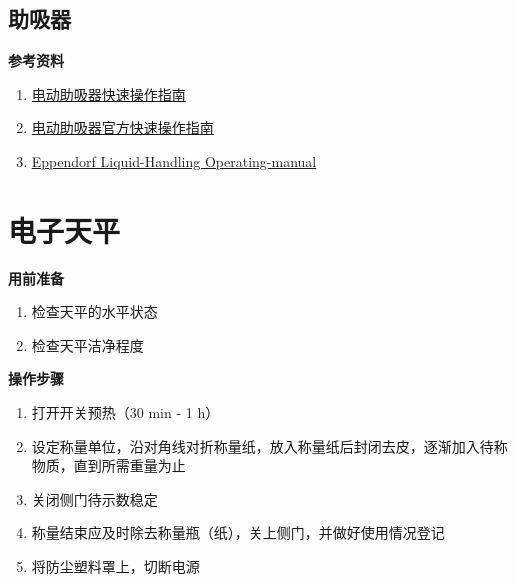 \documentclass[
]{book}
\providecommand{\tightlist}{%
  \setlength{\itemsep}{0pt}\setlength{\parskip}{0pt}}
\begin{document}
\hypertarget{ux52a9ux5438ux5668}{%
\subsection{助吸器}\label{ux52a9ux5438ux5668}}

\textbf{参考资料}

\begin{enumerate}
\def\labelenumi{\arabic{enumi}.}
\tightlist
\item
  \href{http://www.sccos.cn/9.pdf}{电动助吸器快速操作指南}
\item
  \href{https://www.eppendorf.com/product-media/doc/en/166659_Short-Instructions/Eppendorf_Liquid-Handling_Short-instructions_Easypet-3_Easypet-3.pdf?_ga=2.144546805.1938597545.1659465477-672298651.1659375433}{电动助吸器官方快速操作指南}
\item
  \href{https://www.eppendorf.com/product-media/doc/zh/166652_Operating-Manual/Eppendorf_Liquid-Handling_Operating-manual_Easypet-3_Easypet-3.pdf?_ga=2.115859398.1938597545.1659465477-672298651.1659375433}{Eppendorf Liquid-Handling Operating-manual}
\end{enumerate}

\hypertarget{ux7535ux5b50ux5929ux5e73}{%
\section{电子天平}\label{ux7535ux5b50ux5929ux5e73}}

\textbf{用前准备}

\begin{enumerate}
\def\labelenumi{\arabic{enumi}.}
\tightlist
\item
  检查天平的水平状态
\item
  检查天平洁净程度
\end{enumerate}

\textbf{操作步骤}

\begin{enumerate}
\def\labelenumi{\arabic{enumi}.}
\tightlist
\item
  打开开关预热（30 min - 1 h）
\item
  设定称量单位，沿对角线对折称量纸，放入称量纸后封闭去皮，逐渐加入待称物质，直到所需重量为止
\item
  关闭侧门待示数稳定
\item
  称量结束应及时除去称量瓶（纸），关上侧门，并做好使用情况登记
\item
  将防尘塑料罩上，切断电源
\end{enumerate}
\end{document}

